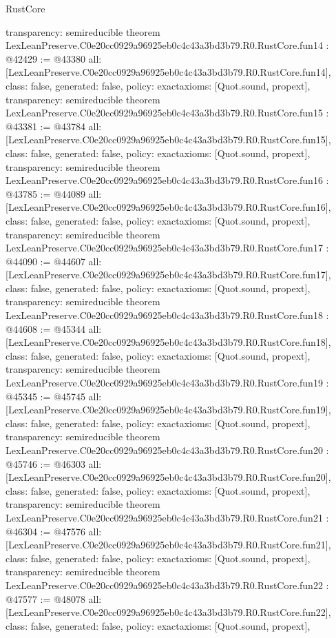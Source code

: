 \begin{lexlean}{RustCore}
\begin{coremodule}
{  transparency: semireducible
}
theorem LexLeanPreserve.C0e20cc0929a96925eb0c4c43a3bd3b79.R0.RustCore.fun14 : @42429 := @43380 {
  all: [LexLeanPreserve.C0e20cc0929a96925eb0c4c43a3bd3b79.R0.RustCore.fun14],
  class: false,
  generated: false,
  policy: exact{axioms: [Quot.sound, propext]},
  transparency: semireducible
}
theorem LexLeanPreserve.C0e20cc0929a96925eb0c4c43a3bd3b79.R0.RustCore.fun15 : @43381 := @43784 {
  all: [LexLeanPreserve.C0e20cc0929a96925eb0c4c43a3bd3b79.R0.RustCore.fun15],
  class: false,
  generated: false,
  policy: exact{axioms: [Quot.sound, propext]},
  transparency: semireducible
}
theorem LexLeanPreserve.C0e20cc0929a96925eb0c4c43a3bd3b79.R0.RustCore.fun16 : @43785 := @44089 {
  all: [LexLeanPreserve.C0e20cc0929a96925eb0c4c43a3bd3b79.R0.RustCore.fun16],
  class: false,
  generated: false,
  policy: exact{axioms: [Quot.sound, propext]},
  transparency: semireducible
}
theorem LexLeanPreserve.C0e20cc0929a96925eb0c4c43a3bd3b79.R0.RustCore.fun17 : @44090 := @44607 {
  all: [LexLeanPreserve.C0e20cc0929a96925eb0c4c43a3bd3b79.R0.RustCore.fun17],
  class: false,
  generated: false,
  policy: exact{axioms: [Quot.sound, propext]},
  transparency: semireducible
}
theorem LexLeanPreserve.C0e20cc0929a96925eb0c4c43a3bd3b79.R0.RustCore.fun18 : @44608 := @45344 {
  all: [LexLeanPreserve.C0e20cc0929a96925eb0c4c43a3bd3b79.R0.RustCore.fun18],
  class: false,
  generated: false,
  policy: exact{axioms: [Quot.sound, propext]},
  transparency: semireducible
}
theorem LexLeanPreserve.C0e20cc0929a96925eb0c4c43a3bd3b79.R0.RustCore.fun19 : @45345 := @45745 {
  all: [LexLeanPreserve.C0e20cc0929a96925eb0c4c43a3bd3b79.R0.RustCore.fun19],
  class: false,
  generated: false,
  policy: exact{axioms: [Quot.sound, propext]},
  transparency: semireducible
}
theorem LexLeanPreserve.C0e20cc0929a96925eb0c4c43a3bd3b79.R0.RustCore.fun20 : @45746 := @46303 {
  all: [LexLeanPreserve.C0e20cc0929a96925eb0c4c43a3bd3b79.R0.RustCore.fun20],
  class: false,
  generated: false,
  policy: exact{axioms: [Quot.sound, propext]},
  transparency: semireducible
}
theorem LexLeanPreserve.C0e20cc0929a96925eb0c4c43a3bd3b79.R0.RustCore.fun21 : @46304 := @47576 {
  all: [LexLeanPreserve.C0e20cc0929a96925eb0c4c43a3bd3b79.R0.RustCore.fun21],
  class: false,
  generated: false,
  policy: exact{axioms: [Quot.sound, propext]},
  transparency: semireducible
}
theorem LexLeanPreserve.C0e20cc0929a96925eb0c4c43a3bd3b79.R0.RustCore.fun22 : @47577 := @48078 {
  all: [LexLeanPreserve.C0e20cc0929a96925eb0c4c43a3bd3b79.R0.RustCore.fun22],
  class: false,
  generated: false,
  policy: exact{axioms: [Quot.sound, propext]},
}
\end{coremodule}
\end{lexlean}
